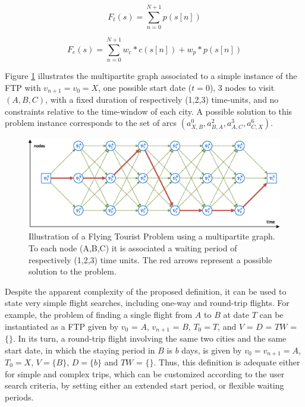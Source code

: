 \documentclass[onecolumn]{elsarticle}
\begin{document}
\begin{equation}
\label{eq:obj_time}
  F_{t}(s) = \sum_{n=0}^{N+1} p(s[n])
\end{equation}

\begin{equation}
\label{eq:obj_entropy}
  F_{e}(s) = \sum_{n=0}^{N+1} w_c*c(s[n]) + w_p*p(s[n])
\end{equation}

Figure \ref{fig:multipartite_sol} illustrates the multipartite graph associated to a simple instance of the FTP with $v_{n+1} = v_0 = X$, one possible start date ($t = 0$), 3 nodes to visit $(A, B, C)$, with a fixed duration of respectively (1,2,3) time-units, and no constraints relative to the time-window of each city. A possible solution to this problem instance corresponds to the set of arcs $(a_{X,B}^{0}, a_{B,A}^{2}, a_{A,C}^{3}, a_{C,X}^{6})$.

\begin{figure}[tbp]
  \centering
  \includegraphics[width=1.0\columnwidth]{./fig1.eps}
  \caption{Illustration of a Flying Tourist Problem using a multipartite graph. To each node (A,B,C) it is associated a waiting period of respectively (1,2,3) time units. The red arrows represent a possible solution to the problem.}
  \label{fig:multipartite_sol}
  \vspace*{-0.5cm}
 \end{figure}

Despite the apparent complexity of the proposed definition, it can be used to state very simple flight searches, including one-way and round-trip flights. For example, the problem of finding a single flight from $A$ to $B$ at date $T$ can be instantiated as a FTP given by $v_0$ = $A$, $v_{n+1}$ = $B$, $T_{0} = T$, and $V$ = $D$ = $TW$ = $\{\}$. In its turn, a round-trip flight involving the same two cities and the same start date, in which the staying period in $B$ is $b$ days, is given by $v_0 = v_{n+1} = A$, $T_{0} = X$, $V = \{B\}$, $D = \{b\}$ and $TW$ = $\{\}$. Thus, this definition is adequate either for simple and complex trips, which can be customized according to the user search criteria, by setting either an extended start period, or flexible waiting periods.
\end{document}
